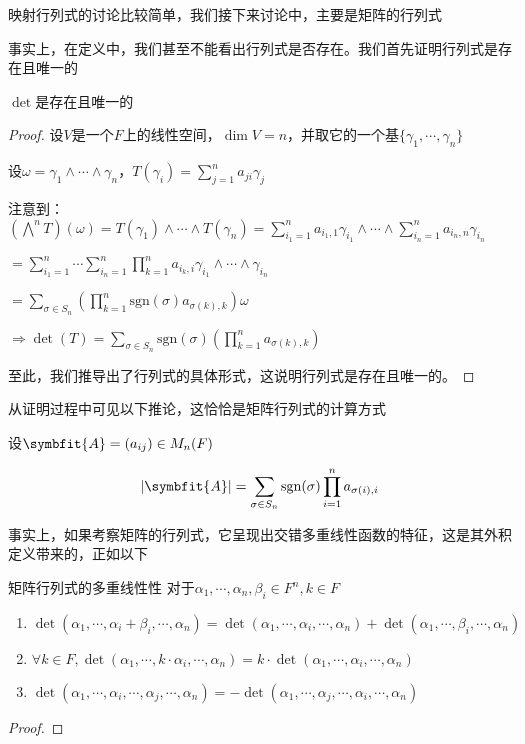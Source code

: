 \documentclass[12pt, a4paper, oneside, UTF8]{ctexbook}
\begin{document}
			映射行列式的讨论比较简单，我们接下来讨论中，主要是矩阵的行列式
			\begin{para}{0}

					事实上，在定义中，我们甚至不能看出行列式是否存在。我们首先证明行列式是存在且唯一的
					\begin{proposition}
						$\det$是存在且唯一的
					\end{proposition}
					\begin{proof}
						设$V$是一个$F$上的线性空间，$\dim V = n$，并取它的一个基$\{\gamma_1,\cdots,\gamma_n\}$

						设$\omega =\gamma _1 \wedge \cdots \wedge \gamma _n$，$T(\gamma_i) = \sum\limits_{j=1}^{n} a_{ji}\gamma_j$

						注意到：$\left(\bigwedge^n T\right)(\omega )=T(\gamma _1)\wedge\cdots\wedge T(\gamma _n)=\sum\limits_{i_1=1}^{n} a_{i_1,1} \gamma_{i_1}\wedge \cdots \wedge \sum\limits_{i_n=1}^{n} a_{i_n,n} \gamma_{i_n}$

						$=\sum\limits_{i_1=1}^{n}\cdots \sum\limits_{i_n=1}^{n} \prod\limits_{k=1}^{n}a_{i_k,i} \gamma _{i_1}\wedge\cdots\wedge\gamma _{i_n}$

						$=\sum\limits_{\sigma \in S_n} \left(\prod\limits_{k=1}^{n}\text{sgn}(\sigma )a_{\sigma(k),k} \right)\omega $

						$\Rightarrow \det(T)=\sum\limits_{\sigma \in S_n} \text{sgn}(\sigma )\left(\prod\limits_{k=1}^{n}a_{\sigma(k),k} \right)$

						至此，我们推导出了行列式的具体形式，这说明行列式是存在且唯一的。
					\end{proof}
					从证明过程中可见以下推论，这恰恰是矩阵行列式的计算方式
					\begin{corollary}{}
						设$\symbfit{A}=(a_{ij})\in M_n(F)$
						
						\begin{equation}
							|\symbfit{A}|=\sum_{\sigma \in S_n} \text{sgn}(\sigma) \prod_{i=1}^n a_{\sigma(i),i}
						\end{equation}
					\end{corollary}

					事实上，如果考察矩阵的行列式，它呈现出交错多重线性函数的特征，这是其外积定义带来的，正如以下
					\begin{them}{矩阵行列式的多重线性性}{}
						对于$\alpha_1,\cdots,\alpha_n,\beta_i \in F^n,k \in F$

						\begin{enumerate}
							\item $\det(\alpha_1,\cdots,\alpha_i + \beta_i,\cdots,\alpha_n)=\det(\alpha_1,\cdots,\alpha_i,\cdots,\alpha_n)+\det(\alpha_1,\cdots,\beta_i,\cdots,\alpha_n)$
							\item $\forall k\in F,\det(\alpha_1,\cdots,k\cdot \alpha_i,\cdots,\alpha_n)=k \cdot \det(\alpha_1,\cdots,\alpha_i,\cdots,\alpha_n)$
							\item $\det(\alpha_1,\cdots,\alpha_i,\cdots,\alpha_j,\cdots,\alpha_n)=-\det(\alpha_1,\cdots,\alpha_j,\cdots,\alpha_i,\cdots,\alpha_n)$
						\end{enumerate}
					\end{them}
					\begin{proof}
						

\end{proof}
\end{para}
\end{document}
